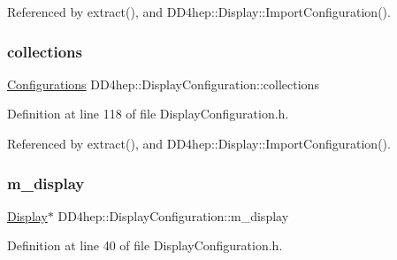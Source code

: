 Referenced by extract(), and D\+D4hep\+::\+Display\+::\+Import\+Configuration().

\hypertarget{class_d_d4hep_1_1_display_configuration_af92e64fe8730543b07e698279dd23f7a}{}\label{class_d_d4hep_1_1_display_configuration_af92e64fe8730543b07e698279dd23f7a} 
\subsubsection{\texorpdfstring{collections}{collections}}
{\footnotesize\ttfamily \hyperlink{class_d_d4hep_1_1_display_configuration_ac43586ae2c70f106cc9027d452d383d7}{Configurations} D\+D4hep\+::\+Display\+Configuration\+::collections}



Definition at line 118 of file Display\+Configuration.\+h.



Referenced by extract(), and D\+D4hep\+::\+Display\+::\+Import\+Configuration().

\hypertarget{class_d_d4hep_1_1_display_configuration_aafc55c829834377c847861133f87637a}{}\label{class_d_d4hep_1_1_display_configuration_aafc55c829834377c847861133f87637a} 
\subsubsection{\texorpdfstring{m\+\_\+display}{m\_display}}
{\footnotesize\ttfamily \hyperlink{class_d_d4hep_1_1_display}{Display}$\ast$ D\+D4hep\+::\+Display\+Configuration\+::m\+\_\+display\hspace{0.3cm}{\ttfamily [protected]}}



Definition at line 40 of file Display\+Configuration.\+h.

\hypertarget{class_d_d4hep_1_1_display_configuration_a630bc25ef7e739a5067c72b6b7996527}{}\label{class_d_d4hep_1_1_display_configuration_a630bc25ef7e739a5067c72b6b7996527} 
